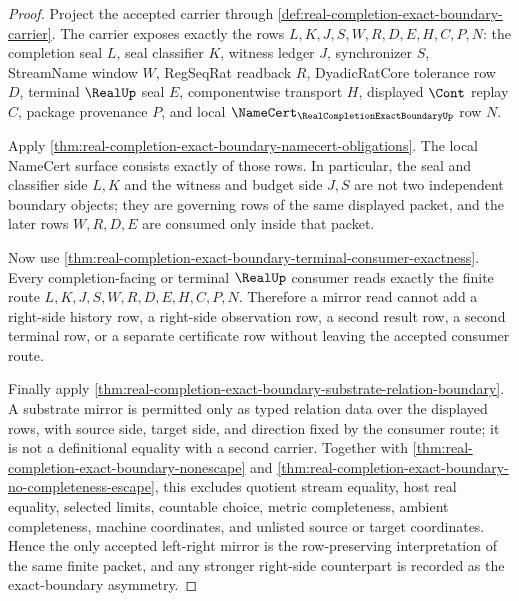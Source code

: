 \begin{proof}
Project the accepted carrier through \autoref{def:real-completion-exact-boundary-carrier}. The carrier exposes exactly the rows $L,K,J,S,W,R,D,E,H,C,P,N$: the completion seal $L$, seal classifier $K$, witness ledger $J$, synchronizer $S$, StreamName window $W$, RegSeqRat readback $R$, DyadicRatCore tolerance row $D$, terminal $\RealUp$ seal $E$, componentwise transport $H$, displayed $\Cont$ replay $C$, package provenance $P$, and local $\NameCert_{\RealCompletionExactBoundaryUp}$ row $N$.

Apply \autoref{thm:real-completion-exact-boundary-namecert-obligations}. The local NameCert surface consists exactly of those rows. In particular, the seal and classifier side $L,K$ and the witness and budget side $J,S$ are not two independent boundary objects; they are governing rows of the same displayed packet, and the later rows $W,R,D,E$ are consumed only inside that packet.

Now use \autoref{thm:real-completion-exact-boundary-terminal-consumer-exactness}. Every completion-facing or terminal $\RealUp$ consumer reads exactly the finite route $L,K,J,S,W,R,D,E,H,C,P,N$. Therefore a mirror read cannot add a right-side history row, a right-side observation row, a second result row, a second terminal row, or a separate certificate row without leaving the accepted consumer route.

Finally apply \autoref{thm:real-completion-exact-boundary-substrate-relation-boundary}. A substrate mirror is permitted only as typed relation data over the displayed rows, with source side, target side, and direction fixed by the consumer route; it is not a definitional equality with a second carrier. Together with \autoref{thm:real-completion-exact-boundary-nonescape} and \autoref{thm:real-completion-exact-boundary-no-completeness-escape}, this excludes quotient stream equality, host real equality, selected limits, countable choice, metric completeness, ambient completeness, machine coordinates, and unlisted source or target coordinates. Hence the only accepted left-right mirror is the row-preserving interpretation of the same finite packet, and any stronger right-side counterpart is recorded as the exact-boundary asymmetry.
\end{proof}
